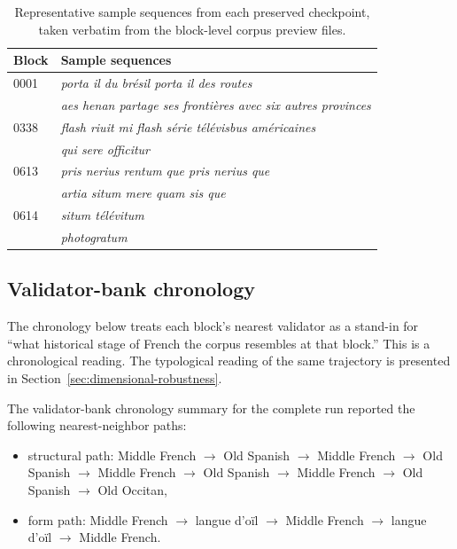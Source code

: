 \documentclass[11pt]{article}
\begin{document}
\begin{table}[h]
\centering
\caption{Representative sample sequences from each preserved checkpoint,
taken verbatim from the block-level corpus preview files.}
\label{tab:checkpointsamples}
\begin{tabular}{lp{4.5in}}
\toprule
Block & Sample sequences \\
\midrule
0001 & \emph{porta il du br\'esil porta il des routes} \\
     & \emph{aes henan partage ses fronti\`eres avec six autres provinces} \\
\midrule
0338 & \emph{flash riuit mi flash s\'erie t\'el\'evisbus am\'ericaines} \\
     & \emph{qui sere officitur} \\
\midrule
0613 & \emph{pris nerius rentum que pris nerius que} \\
     & \emph{artia situm mere quam sis que} \\
\midrule
0614 & \emph{situm t\'el\'evitum} \\
     & \emph{photogratum} \\
\bottomrule
\end{tabular}
\end{table}

\subsection{Validator-bank chronology}

The chronology below treats each block's nearest validator as a stand-in for
``what historical stage of French the corpus resembles at that block.''
This is a chronological reading. The typological reading of the same
trajectory is
presented in Section~\ref{sec:dimensional-robustness}.

The validator-bank chronology summary for the complete run reported the
following nearest-neighbor paths:

\begin{itemize}
    \item structural path:
    Middle French $\rightarrow$ Old Spanish $\rightarrow$
    Middle French $\rightarrow$ Old Spanish $\rightarrow$
    Middle French $\rightarrow$ Old Spanish $\rightarrow$
    Middle French $\rightarrow$ Old Spanish $\rightarrow$
    Old Occitan,
    \item form path:
    Middle French $\rightarrow$ langue d'o\"il $\rightarrow$
    Middle French $\rightarrow$ langue d'o\"il $\rightarrow$
    Middle French.
\end{itemize}
\end{document}
